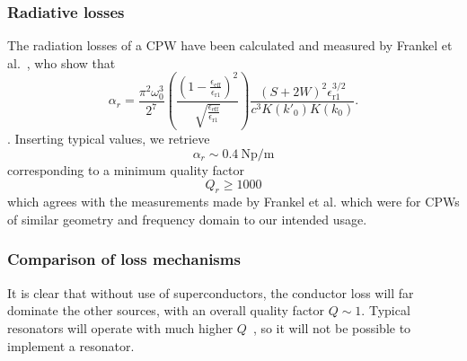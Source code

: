 \subsubsection*{Radiative losses}

The radiation losses of a CPW have been calculated and measured by Frankel et
al.~\cite{Frankel1991}, who show that
\begin{equation}
  \alpha_r = \frac{\pi^2 \omega_0^3}{2^7}\left(\frac{\left(1 -
  \frac{\epsilon_\mathrm{eff}}{\epsilon_\mathrm{r1}}\right)^2}{\sqrt{\frac{\epsilon_\mathrm{eff}}{\epsilon_\mathrm{r1}}}}\right)
  \frac{(S+2W)^2\epsilon_\mathrm{r1}^{3/2}}{c^3 K(k'_0)K(k_0)}.
\end{equation}.
Inserting typical values, we retrieve 
\begin{equation}
  \alpha_r \sim \SI{0.4}{\neper\per\metre}
\end{equation}
corresponding to a minimum quality factor
\begin{equation}
  Q_r \geq 1000
\end{equation}
which agrees with the measurements made by Frankel et al. which were for CPWs of
similar geometry and frequency domain to our intended usage.

\subsubsection*{Comparison of loss mechanisms}

It is clear that without use of superconductors, the conductor loss will far
dominate the other sources, with an overall quality factor $Q\sim1$. Typical
resonators will operate with much higher $Q$~\cite{Hattermann2017}, so it will
not be possible to implement a resonator.

